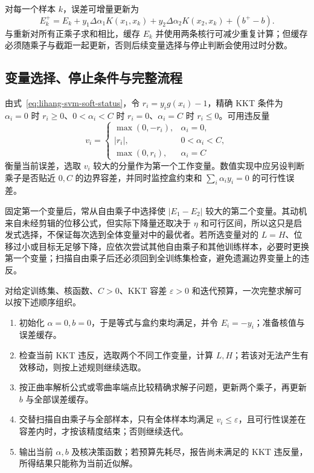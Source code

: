 对每一个样本 $k$，误差可增量更新为
\begin{equation}
  E_k^+=E_k+y_1\Delta\alpha_1K(x_1,x_k)
              +y_2\Delta\alpha_2K(x_2,x_k)+(b^+-b).
  \label{eq:lihang-svm-smo-error-update}
\end{equation}
与重新对所有正乘子求和相比，缓存 $E_k$ 并使用两条核行可减少重复计算；但缓存必须随乘子与截距一起更新，否则后续变量选择与停止判断会使用过时分数。

\subsection{变量选择、停止条件与完整流程}

由式~\eqref{eq:lihang-svm-soft-status}，令 $r_i=y_i g(x_i)-1$，精确 KKT 条件为 $\alpha_i=0$ 时 $r_i\ge0$、$0<\alpha_i<C$ 时 $r_i=0$、$\alpha_i=C$ 时 $r_i\le0$。可用违反量
\begin{equation}
  v_i=
  \begin{cases}
    \max(0,-r_i),&\alpha_i=0,\\
    |r_i|,&0<\alpha_i<C,\\
    \max(0,r_i),&\alpha_i=C
  \end{cases}
  \label{eq:lihang-svm-kkt-residual}
\end{equation}
衡量当前误差，选取 $v_i$ 较大的分量作为第一个工作变量。数值实现中应另设判断乘子是否贴近 $0,C$ 的边界容差，并同时监控盒约束和 $\sum_i\alpha_i y_i=0$ 的可行性误差。

固定第一个变量后，常从自由乘子中选择使 $|E_1-E_2|$ 较大的第二个变量。其动机来自未经剪辑的位移公式，但实际下降量还取决于 $\eta$ 和可行区间，所以这只是启发式选择，不保证每次选到全体变量对中的最优者。若所选变量对的 $L=H$、位移过小或目标无足够下降，应依次尝试其他自由乘子和其他训练样本，必要时更换第一个变量；扫描自由乘子后还必须回到全训练集检查，避免遗漏边界变量上的违反。

对给定训练集、核函数、$C>0$、KKT 容差 $\varepsilon>0$ 和迭代预算，一次完整求解可以按下述顺序组织。
\begin{enumerate}
  \item 初始化 $\alpha=0,b=0$，于是等式与盒约束均满足，并令 $E_i=-y_i$；准备核值与误差缓存。
  \item 检查当前 KKT 违反，选取两个不同工作变量，计算 $L,H$；若该对无法产生有效移动，则按上述规则继续选取。
  \item 按正曲率解析公式或零曲率端点比较精确求解子问题，更新两个乘子，再更新 $b$ 与全部误差缓存。
  \item 交替扫描自由乘子与全部样本，只有全体样本均满足 $v_i\le\varepsilon$，且可行性误差在容差内时，才按该精度结束；否则继续迭代。
  \item 输出当前 $\alpha,b$ 及核决策函数；若预算先耗尽，报告尚未满足的 KKT 违反量，所得结果只能称为当前近似解。
\end{enumerate}

